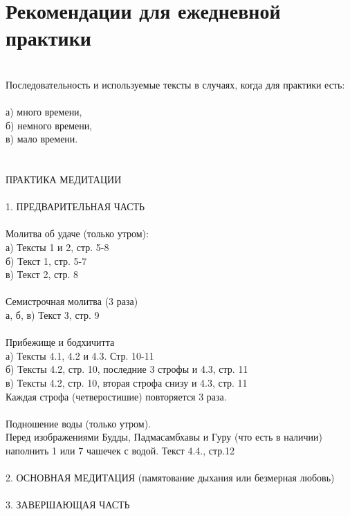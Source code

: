 \documentclass[4pt,oneside]{article}
\begin{document}
   \thispagestyle{empty}

\setmainfont{Geometria}

\scriptsize
\section*{Рекомендации для ежедневной практики}\\
\vspace{0.8cm}
Последовательность и используемые тексты в случаях, когда для практики есть:\\
\\
\indent а) много времени,\\
\indent б) немного времени,\\
\indent в) мало времени.\\
\\
\\
ПРАКТИКА МЕДИТАЦИИ\\
\\
1. ПРЕДВАРИТЕЛЬНАЯ ЧАСТЬ\\
\\
Молитва об удаче (только утром):\\
\indent а) Тексты 1 и 2, стр. 5-8\\
\indent б) Текст 1, стр. 5-7\\
\indent в) Текст 2, стр. 8\\

\\
\noindent Семистрочная молитва (3 раза)\\
\indent а, б, в) Текст 3, стр. 9\\
\\
Прибежище и бодхичитта\\
\indent а) Тексты 4.1, 4.2 и 4.3. Стр. 10-11\\
\indent б) Тексты 4.2, стр. 10, последние 3 строфы и 4.3, стр. 11\\
\indent в) Тексты 4.2, стр. 10, вторая строфа снизу и 4.3, стр. 11\\
\indent Каждая строфа (четверостишие) повторяется 3 раза.\\
\\
Подношение воды (только утром).\\
\indent Перед изображениями Будды, Падмасамбхавы и Гуру (что есть в наличии)\\
\indent наполнить 1 или 7 чашечек с водой.
        Текст 4.4., стр.12\\
\\
2. ОСНОВНАЯ МЕДИТАЦИЯ (памятование дыхания или безмерная любовь)\\
\\
3. ЗАВЕРШАЮЩАЯ ЧАСТЬ\\
\end{document}
